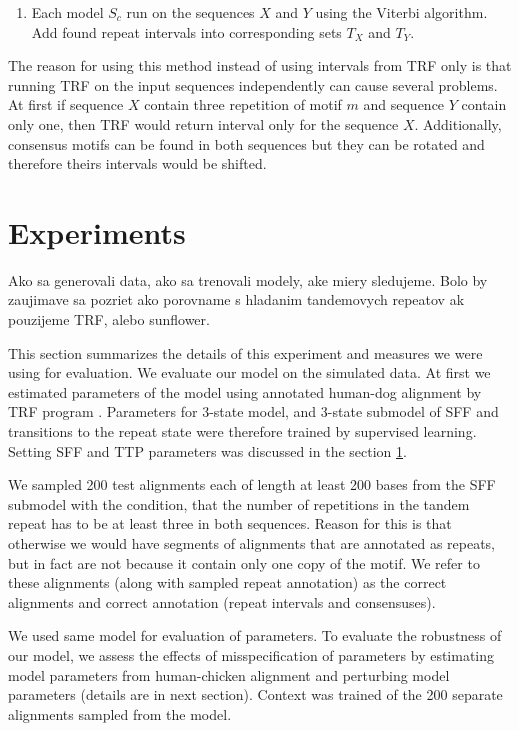 \begin{itemize}[itemsep=-1mm]
\begin{enumerate}[itemsep=-1mm]
\item Each model $S_c$ run on the sequences $X$ and $Y$ using the Viterbi
algorithm. Add found repeat intervals into corresponding sets $T_X$ and $T_Y$.

\end{enumerate}
The reason for using this method instead of using intervals from TRF only is
that running TRF on the input sequences independently can cause several
problems. At first if sequence $X$ contain three repetition of motif $m$ and
sequence $Y$ contain only one, then TRF would return interval only for the
sequence $X$. Additionally, consensus motifs can be found in both sequences but
they can be rotated and therefore theirs intervals would be shifted.

\end{itemize}

\section{Experiments}
\begin{reformulate*}
Ako sa generovali data, ako sa trenovali modely, ake miery sledujeme.  Bolo by
zaujimave sa pozriet ako porovname s hladanim tandemovych repeatov ak pouzijeme
TRF, alebo sunflower.

\end{reformulate*}


This section summarizes the details of this experiment and measures we were
using for evaluation. We evaluate our model on the simulated data. At first we
estimated parameters of the model using annotated human-dog alignment by TRF
program \cite{Benson1999}.  Parameters for 3-state model, and 3-state submodel
of SFF and transitions to the repeat state were therefore trained by supervised
learning. Setting SFF and TTP parameters was discussed in the section \ref{}.

We sampled 200 test alignments each of length at least 200 bases from the SFF
submodel with the condition, that the number of repetitions in the tandem
repeat has to be at least three in both sequences. Reason for this is that
otherwise we would have segments of alignments that are annotated as repeats,
but in fact are not because it contain only one copy of the motif. We refer to
these alignments (along with sampled repeat annotation) as the correct
alignments and correct annotation (repeat intervals and consensuses).

We used same model for evaluation of parameters. To evaluate the robustness of
our model, we assess the effects of misspecification of parameters by
estimating model parameters from human-chicken alignment and perturbing model
parameters (details are in next section). Context \cite{} was trained of the
200 separate alignments sampled from the model. 

